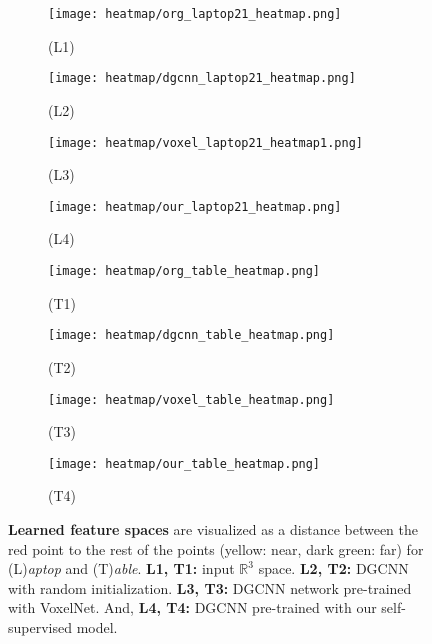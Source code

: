 \documentclass{article}
\begin{document}
\begin{figure}[h]
	\centering
	\begin{subfigure}{.45\textwidth}
		\centering
		\texttt{[image: heatmap/org\_laptop21\_heatmap.png]}
		\caption*{(L1)}
		\label{fig:heat1}
	\end{subfigure}\begin{subfigure}{.45\textwidth}
		\centering
		\texttt{[image: heatmap/dgcnn\_laptop21\_heatmap.png]}
		\caption*{(L2)}
		\label{fig:heat2}
    \end{subfigure}
    \begin{subfigure}{.45\textwidth}
		\centering
		\texttt{[image: heatmap/voxel\_laptop21\_heatmap1.png]}
		\caption*{(L3)}
		\label{fig:heat3}
	\end{subfigure}\begin{subfigure}{.45\textwidth}
		\centering
		\texttt{[image: heatmap/our\_laptop21\_heatmap.png]}
		\caption*{(L4)}
		\label{fig:heat4}
	\end{subfigure}
	\begin{subfigure}{.45\textwidth}
		\centering
		\texttt{[image: heatmap/org\_table\_heatmap.png]}
		\caption*{(T1)}
		\label{fig:heat5}
    \end{subfigure}\begin{subfigure}{.45\textwidth}
		\centering
		\texttt{[image: heatmap/dgcnn\_table\_heatmap.png]}
		\caption*{(T2)}
		\label{fig:heat6}
    \end{subfigure}
    \begin{subfigure}{.45\textwidth}
		\centering
		\texttt{[image: heatmap/voxel\_table\_heatmap.png]}
		\caption*{(T3)}
		\label{fig:heat7}
	\end{subfigure}\begin{subfigure}{.45\textwidth}
		\centering
		\texttt{[image: heatmap/our\_table\_heatmap.png]}
		\caption*{(T4)}
		\label{fig:heat8}
    \end{subfigure}
	\caption{\textbf{Learned feature spaces} are visualized as a distance between the red point to the rest of the points (yellow: near, dark green: far) for (L)\emph{aptop} and (T)\emph{able}. \textbf{L1, T1:} input $\mathbb{R}^{3}$ space. \textbf{L2, T2:} DGCNN with random initialization. \textbf{L3, T3:} DGCNN network pre-trained with VoxelNet. And, \textbf{L4, T4:} DGCNN pre-trained with our self-supervised model.}
	\label{fig:heatmap_supp2}
\end{figure}    
\end{document}
